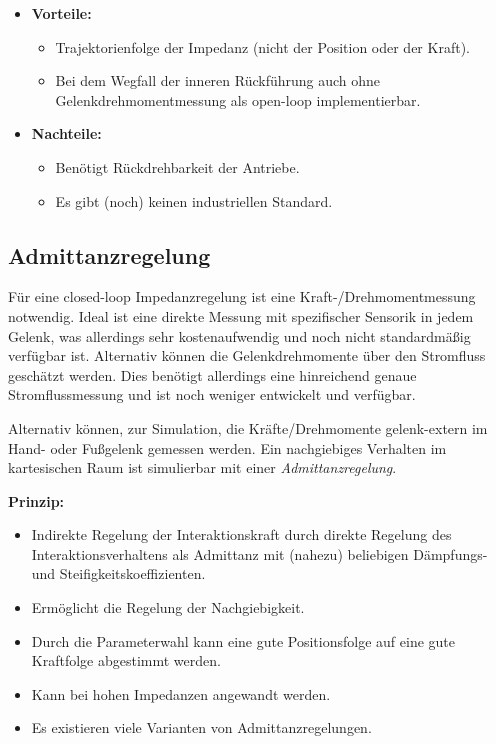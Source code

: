 \documentclass[a4paper, 11pt, accentcolor = tud3b]{tudreport}
\begin{document}
				\begin{itemize}
					\item \textbf{Vorteile:}
						\begin{itemize}
							\item Trajektorienfolge der Impedanz (nicht der Position oder der Kraft).
							\item Bei dem Wegfall der inneren Rückführung auch ohne Gelenkdrehmomentmessung als open-loop implementierbar.
						\end{itemize}
					\item \textbf{Nachteile:}
						\begin{itemize}
							\item Benötigt Rückdrehbarkeit der Antriebe.
							\item Es gibt (noch) keinen industriellen Standard.
						\end{itemize}
				\end{itemize}

			\subsection{Admittanzregelung}
				Für eine closed-loop Impedanzregelung ist eine Kraft-/Drehmomentmessung notwendig. Ideal ist eine direkte Messung mit spezifischer Sensorik in jedem Gelenk, was allerdings sehr kostenaufwendig und noch nicht standardmäßig verfügbar ist. Alternativ können die Gelenkdrehmomente über den Stromfluss geschätzt werden. Dies benötigt allerdings eine hinreichend genaue Stromflussmessung und ist noch weniger entwickelt und verfügbar.
				
				Alternativ können, zur Simulation, die Kräfte/Drehmomente gelenk-extern im Hand- oder Fußgelenk gemessen werden. Ein nachgiebiges Verhalten im kartesischen Raum ist simulierbar mit einer \emph{Admittanzregelung}.
				
				\textbf{Prinzip:}
				\begin{itemize}
					\item Indirekte Regelung der Interaktionskraft durch direkte Regelung des Interaktionsverhaltens als Admittanz mit (nahezu) beliebigen Dämpfungs- und Steifigkeitskoeffizienten.
					\item Ermöglicht die Regelung der Nachgiebigkeit.
					\item Durch die Parameterwahl kann eine gute Positionsfolge auf eine gute Kraftfolge abgestimmt werden.
					\item Kann bei hohen Impedanzen angewandt werden.
					\item Es existieren viele Varianten von Admittanzregelungen.
				\end{itemize}
			
\end{document}
